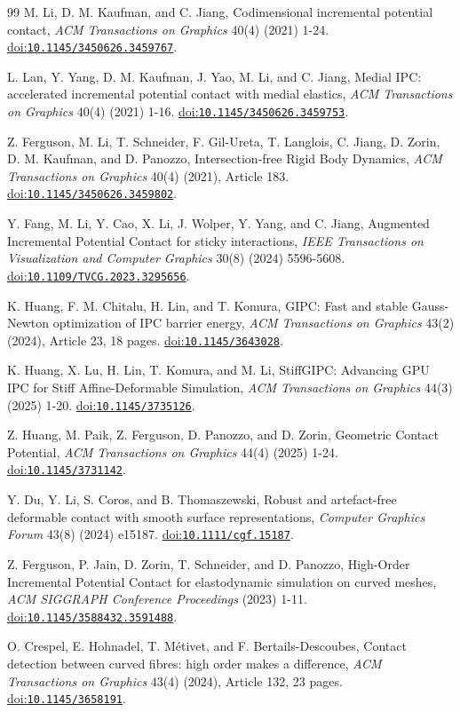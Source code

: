 \documentclass[preprint,12pt]{elsarticle}
\newcommand{\doi}[1]{\href{https://doi.org/#1}{doi:\nolinkurl{#1}}}
\begin{document}
\begin{thebibliography}{99}
M. Li, D. M. Kaufman, and C. Jiang, Codimensional incremental potential contact, \emph{ACM Transactions on Graphics} 40(4) (2021) 1-24. \doi{10.1145/3450626.3459767}.

L. Lan, Y. Yang, D. M. Kaufman, J. Yao, M. Li, and C. Jiang, Medial IPC: accelerated incremental potential contact with medial elastics, \emph{ACM Transactions on Graphics} 40(4) (2021) 1-16. \doi{10.1145/3450626.3459753}.

Z. Ferguson, M. Li, T. Schneider, F. Gil-Ureta, T. Langlois, C. Jiang, D. Zorin, D. M. Kaufman, and D. Panozzo, Intersection-free Rigid Body Dynamics, \emph{ACM Transactions on Graphics} 40(4) (2021), Article 183. \doi{10.1145/3450626.3459802}.

Y. Fang, M. Li, Y. Cao, X. Li, J. Wolper, Y. Yang, and C. Jiang, Augmented Incremental Potential Contact for sticky interactions, \emph{IEEE Transactions on Visualization and Computer Graphics} 30(8) (2024) 5596-5608. \doi{10.1109/TVCG.2023.3295656}.

K. Huang, F. M. Chitalu, H. Lin, and T. Komura, GIPC: Fast and stable Gauss-Newton optimization of IPC barrier energy, \emph{ACM Transactions on Graphics} 43(2) (2024), Article 23, 18 pages. \doi{10.1145/3643028}.

K. Huang, X. Lu, H. Lin, T. Komura, and M. Li, StiffGIPC: Advancing GPU IPC for Stiff Affine-Deformable Simulation, \emph{ACM Transactions on Graphics} 44(3) (2025) 1-20. \doi{10.1145/3735126}.

Z. Huang, M. Paik, Z. Ferguson, D. Panozzo, and D. Zorin, Geometric Contact Potential, \emph{ACM Transactions on Graphics} 44(4) (2025) 1-24. \doi{10.1145/3731142}.

Y. Du, Y. Li, S. Coros, and B. Thomaszewski, Robust and artefact-free deformable contact with smooth surface representations, \emph{Computer Graphics Forum} 43(8) (2024) e15187. \doi{10.1111/cgf.15187}.

Z. Ferguson, P. Jain, D. Zorin, T. Schneider, and D. Panozzo, High-Order Incremental Potential Contact for elastodynamic simulation on curved meshes, \emph{ACM SIGGRAPH Conference Proceedings} (2023) 1-11. \doi{10.1145/3588432.3591488}.

O. Crespel, E. Hohnadel, T. M\'{e}tivet, and F. Bertails-Descoubes, Contact detection between curved fibres: high order makes a difference, \emph{ACM Transactions on Graphics} 43(4) (2024), Article 132, 23 pages. \doi{10.1145/3658191}.


\end{thebibliography}
\end{document}

